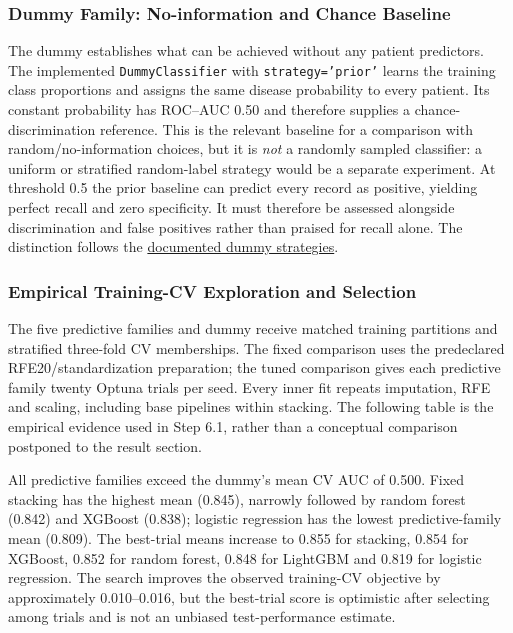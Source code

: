 \subsubsection{Dummy Family: No-information and Chance Baseline}
The dummy establishes what can be achieved without any patient predictors. The implemented \texttt{DummyClassifier} with \texttt{strategy='prior'} learns the training class proportions and assigns the same disease probability to every patient. Its constant probability has ROC--AUC 0.50 and therefore supplies a chance-discrimination reference. This is the relevant baseline for a comparison with random/no-information choices, but it is \emph{not} a randomly sampled classifier: a uniform or stratified random-label strategy would be a separate experiment. At threshold 0.5 the prior baseline can predict every record as positive, yielding perfect recall and zero specificity. It must therefore be assessed alongside discrimination and false positives rather than praised for recall alone. The distinction follows the \href{https://scikit-learn.org/stable/modules/generated/sklearn.dummy.DummyClassifier.html}{documented dummy strategies}.

\subsubsection{Empirical Training-CV Exploration and Selection}
The five predictive families and dummy receive matched training partitions and stratified three-fold CV memberships. The fixed comparison uses the predeclared RFE20/standardization preparation; the tuned comparison gives each predictive family twenty Optuna trials per seed. Every inner fit repeats imputation, RFE and scaling, including base pipelines within stacking. The following table is the empirical evidence used in Step 6.1, rather than a conceptual comparison postponed to the result section.



All predictive families exceed the dummy's mean CV AUC of 0.500. Fixed stacking has the highest mean (0.845), narrowly followed by random forest (0.842) and XGBoost (0.838); logistic regression has the lowest predictive-family mean (0.809). The best-trial means increase to 0.855 for stacking, 0.854 for XGBoost, 0.852 for random forest, 0.848 for LightGBM and 0.819 for logistic regression. The search improves the observed training-CV objective by approximately 0.010--0.016, but the best-trial score is optimistic after selecting among trials and is not an unbiased test-performance estimate.

